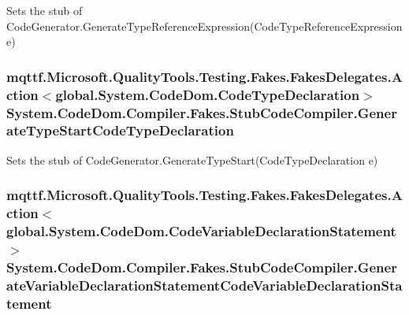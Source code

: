 Sets the stub of Code\-Generator.\-Generate\-Type\-Reference\-Expression(\-Code\-Type\-Reference\-Expression e)

\hypertarget{class_system_1_1_code_dom_1_1_compiler_1_1_fakes_1_1_stub_code_compiler_a76981450d330c2e1d54afe57f6d5f4e9}{
\subsubsection[{Generate\-Type\-Start\-Code\-Type\-Declaration}]{\setlength{\rightskip}{0pt plus 5cm}mqttf.\-Microsoft.\-Quality\-Tools.\-Testing.\-Fakes.\-Fakes\-Delegates.\-Action$<$global.\-System.\-Code\-Dom.\-Code\-Type\-Declaration$>$ System.\-Code\-Dom.\-Compiler.\-Fakes.\-Stub\-Code\-Compiler.\-Generate\-Type\-Start\-Code\-Type\-Declaration}}\label{class_system_1_1_code_dom_1_1_compiler_1_1_fakes_1_1_stub_code_compiler_a76981450d330c2e1d54afe57f6d5f4e9}


Sets the stub of Code\-Generator.\-Generate\-Type\-Start(\-Code\-Type\-Declaration e)

\hypertarget{class_system_1_1_code_dom_1_1_compiler_1_1_fakes_1_1_stub_code_compiler_ad9c9d0d7d0a0a9d46decc2432a36836a}{
\subsubsection[{Generate\-Variable\-Declaration\-Statement\-Code\-Variable\-Declaration\-Statement}]{\setlength{\rightskip}{0pt plus 5cm}mqttf.\-Microsoft.\-Quality\-Tools.\-Testing.\-Fakes.\-Fakes\-Delegates.\-Action$<$global.\-System.\-Code\-Dom.\-Code\-Variable\-Declaration\-Statement$>$ System.\-Code\-Dom.\-Compiler.\-Fakes.\-Stub\-Code\-Compiler.\-Generate\-Variable\-Declaration\-Statement\-Code\-Variable\-Declaration\-Statement}}\label{class_system_1_1_code_dom_1_1_compiler_1_1_fakes_1_1_stub_code_compiler_ad9c9d0d7d0a0a9d46decc2432a36836a}


